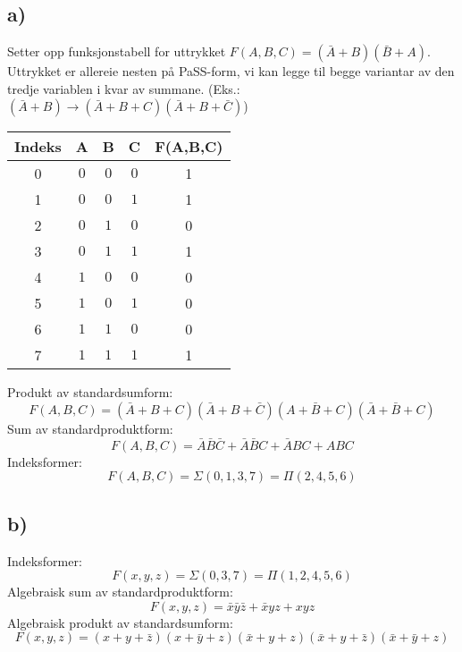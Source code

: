 \documentclass[12pt,a4paper]{article}
\begin{document}
    \subsection{a)}
      Setter opp funksjonstabell for uttrykket $F(A,B,C) = (\bar{A}+B)(\bar{B}+A)$. 
      Uttrykket er allereie nesten på PaSS-form, vi kan legge til begge variantar
      av den tredje variablen i kvar av summane. (Eks.: $(\bar{A}+B)\rightarrow
      (\bar{A}+B+C)(\bar{A}+B+\bar{C})$)
      \begin{center}
        \begin{tabular}{ |c|c|c|c|c| }
          \hline
          Indeks & A & B & C & F(A,B,C) \\
          \hline
          0 & $0$ & $0$ & $0$ & 1 \\
          \hline
          1 & $0$ & $0$ & $1$ & 1 \\
          \hline
          2 & $0$ & $1$ & $0$ & 0 \\
          \hline
          3 & $0$ & $1$ & $1$ & 1 \\
          \hline
          4 & $1$ & $0$ & $0$ & 0 \\
          \hline
          5 & $1$ & $0$ & $1$ & 0 \\
          \hline
          6 & $1$ & $1$ & $0$ & 0 \\
          \hline
          7 & $1$ & $1$ & $1$ & 1 \\
          \hline
        \end{tabular}
      \end{center}
      Produkt av standardsumform:
      \begin{equation}
         F(A,B,C) = (\bar{A}+B+C)(\bar{A}+B+\bar{C})(A+\bar{B}+C)(\bar{A}+\bar{B}+C)
      \end{equation}
      Sum av standardproduktform:
      \begin{equation}
        F(A,B,C) = \bar{A}\bar{B}\bar{C}+\bar{A}\bar{B}C+\bar{A}BC+ABC
      \end{equation}
      Indeksformer:
      \begin{equation}
        F(A,B,C) = \Sigma(0,1,3,7) = \Pi(2,4,5,6)
      \end{equation}

    \subsection{b)}
      Indeksformer:
      \begin{equation}
        F(x,y,z) = \Sigma(0,3,7) = \Pi(1,2,4,5,6)
      \end{equation}
      Algebraisk sum av standardproduktform:
      \begin{equation}
        F(x,y,z) = \bar{x}\bar{y}\bar{z} + \bar{x}yz + xyz
      \end{equation}
      Algebraisk produkt av standardsumform:
      \begin{equation}
        F(x,y,z) = (x+y+\bar{z})(x+\bar{y}+z)(\bar{x}+y+z)(\bar{x}+y+\bar{z})(\bar{x}+\bar{y}+z)
      \end{equation}
\end{document}
